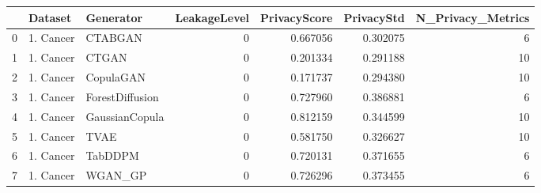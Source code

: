 \begin{tabular}{lllrrrr}
\toprule
 & Dataset & Generator & LeakageLevel & PrivacyScore & PrivacyStd & N_Privacy_Metrics \\
\midrule
0 & 1. Cancer & CTABGAN & 0 & 0.667056 & 0.302075 & 6 \\
1 & 1. Cancer & CTGAN & 0 & 0.201334 & 0.291188 & 10 \\
2 & 1. Cancer & CopulaGAN & 0 & 0.171737 & 0.294380 & 10 \\
3 & 1. Cancer & ForestDiffusion & 0 & 0.727960 & 0.386881 & 6 \\
4 & 1. Cancer & GaussianCopula & 0 & 0.812159 & 0.344599 & 10 \\
5 & 1. Cancer & TVAE & 0 & 0.581750 & 0.326627 & 10 \\
6 & 1. Cancer & TabDDPM & 0 & 0.720131 & 0.371655 & 6 \\
7 & 1. Cancer & WGAN_GP & 0 & 0.726296 & 0.373455 & 6 \\
\bottomrule
\end{tabular}
